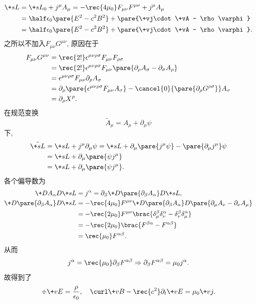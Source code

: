 \documentclass[hidelinks]{ctexart}
\begin{document}
\vspace{-\baselineskip}
\begin{align*}
    \+sL &= \+sL_0 + j^\mu A_\mu = -\rec{4\mu_0}F_{\mu\nu}F^{\mu\nu} + j^\mu A_\mu \\
    &= \half \epsilon_0 \pare{E^2 - c^2B^2} + \pare{\+vj\cdot \+vA - \rho \varphi} \\
    &= \half \epsilon_0 \pare{E^2 - c^2B^2} + \pare{\+vj\cdot \+vA - \rho \varphi}.
\end{align*}
之所以不加入$F_{\mu\nu}G^{\mu\nu}$, 原因在于
\begin{align*}
    F_{\mu\nu}G^{\mu\nu} &= \rec{2!}\epsilon^{\mu\nu\rho\sigma}F_{\mu\nu}F_{\rho\sigma} \\
    &= \rec{2!} \epsilon^{\mu\nu\rho\sigma}F_{\mu\nu}\pare{\partial_\rho A_\sigma - \partial_\sigma A_\rho} \\
    &= \epsilon^{\mu\nu\rho\sigma} F_{\mu\nu}\partial_\rho A_\sigma \\
    &= \partial_\rho \pare{\epsilon^{\mu\nu\rho\sigma} F_{\mu\nu}A_\sigma} - \cancel{0}{\pare{\partial_\rho G^{\rho\sigma}}}A_\sigma \\
    &= \partial_\rho X^\rho.
\end{align*}
在规范变换
\[ \tilde{A}_\mu = A_\mu + \partial_\mu \psi \]
下,
\begin{align*}
    \tilde{\+sL} &= \+sL + j^\mu \partial_\mu \psi = \+sL + \partial_\mu\pare{j^\mu \psi} - \pare{\partial_\mu j^\mu} \psi \\
    &= \+sL + \partial_\mu\pare{\psi j^\mu} \\
    &= \+sL + \partial_\mu\pare{\psi j^\mu}.
\end{align*}
各个偏导数为
\begin{align*}
    \+D{A_\alpha}D{\+sL} &= j^\alpha = \partial_\beta \+D{\pare{\partial_\beta A_\alpha}}D{\+sL}, \\
    \+D{\pare{\partial_\beta A_\alpha}}D{\+sL} &= -\rec{4\mu_0} F^{\mu\nu} \+D{\pare{\partial_\beta A_\alpha}}D{\pare{\partial_\mu A_\nu - \partial_\nu A_\mu}} \\
    &= -\rec{2\mu_0} F^{\mu\nu} \brac{\delta_\mu^\beta \delta_\nu^\alpha - \delta_\nu^\beta \delta_\mu^\alpha} \\
    &= -\rec{2\mu_0} \brac{F^{\beta\alpha} - F^{\alpha\beta}} \\
    &= \rec{\mu_0}F^{\alpha\beta}.
\end{align*}
从而
\[ j^\alpha = \rec{\mu_0}\partial_\beta F^{\alpha\beta} \Rightarrow \partial_\beta F^{\alpha\beta} = \mu_0 j^\alpha. \]
故得到了
\[ \div \+vE = \frac{\rho}{\epsilon_0},\quad \curl \+vB - \rec{c^2}\partial_t \+vE = \mu_0 \+vj. \]
\end{document}

